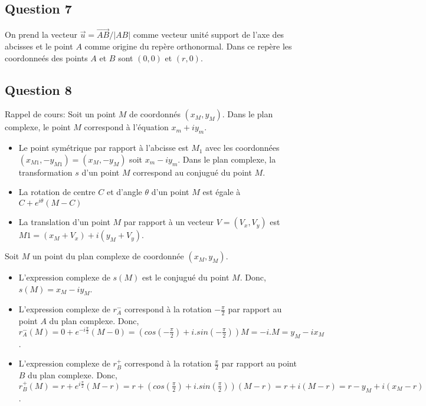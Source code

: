 \documentclass[]{book}
\theoremstyle{definition}
\begin{document}
\subsection*{Question 7}
On prend la vecteur $\overrightarrow{u} = \overrightarrow{AB}/|AB|$ comme vecteur unit\'e support de l'axe des abcisses et le point $A$ comme origine du rep\`ere orthonormal. Dans ce rep\`ere les coordonne\'es des points $A$ et $B$ sont $(0,0)$ et $(r,0)$. 


\subsection*{Question 8}

Rappel de cours: Soit un point $M$ de coordonn\'es $(x_M,y_M)$. Dans le plan complexe, le point $M$ correspond \`a l'\'equation $x_m + iy_m$. 
\begin{itemize}
\item Le point sym\'etrique par rapport \`a l'abcisse est $M_1$ avec les coordonn\'ees $(x_{M1},-y_{M1}) =(x_M,-y_M)$ soit $x_m - iy_m$. Dans le plan complexe, la transformation $s$ d'un point $M$ correspond au conjugu\'e du point $M$.
\item La rotation de centre $C$ et d'angle $\theta$ d'un point $M$ est \'egale \`a $C+e^{i\theta}(M - C)$    
\item La translation d'un point $M$ par rapport \`a un vecteur $V=(V_x, V_y)$ est $M1 = (x_M+V_x) + i(y_M+V_y)$.
\end{itemize}


Soit $M$ un point du plan complexe de coordonn\'ee $(x_M, y_M)$.\\

\begin{itemize}
\item L'expression complexe de $s(M)$ est le conjugu\'e du point $M$. Donc, $s(M) = x_M - iy_M$.
\item L'expression complexe de $r^{-}_A$ correspond \`a la rotation $-\frac{\pi}{2}$ par rapport au point $A$ du plan complexe. Donc, $r^{-}_A(M) = 0 + e^{-i\frac{\pi}{2}}(M-0) = (cos(-\frac{\pi}{2})+i.sin(-\frac{\pi}{2}))M = -i.M = y_M - ix_M$.
\item L'expression complexe de $r^{+}_B$ correspond \`a la rotation $\frac{\pi}{2}$ par rapport au point $B$ du plan complexe. Donc, $r^{+}_B(M) = r + e^{i\frac{\pi}{2}}(M-r) = r + (cos(\frac{\pi}{2})+i.sin(\frac{\pi}{2}))(M-r) = r + i(M-r) = r-y_M + i(x_M-r)$. 
\end{itemize}
\end{document}
